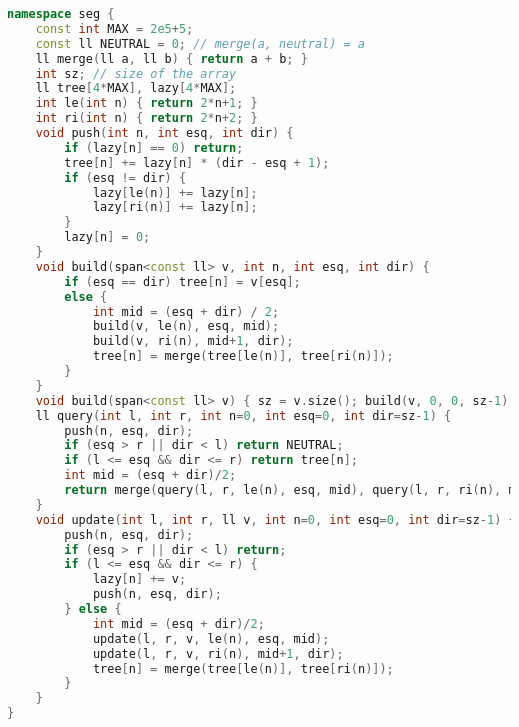 \documentclass[11pt, a4paper, twoside]{article}
\begin{document}
\begin{lstlisting}[language=C++]
namespace seg {
    const int MAX = 2e5+5;
    const ll NEUTRAL = 0; // merge(a, neutral) = a
    ll merge(ll a, ll b) { return a + b; }
    int sz; // size of the array
    ll tree[4*MAX], lazy[4*MAX];
    int le(int n) { return 2*n+1; }
    int ri(int n) { return 2*n+2; }
    void push(int n, int esq, int dir) {
        if (lazy[n] == 0) return;
        tree[n] += lazy[n] * (dir - esq + 1);
        if (esq != dir) {
            lazy[le(n)] += lazy[n];
            lazy[ri(n)] += lazy[n];
        }
        lazy[n] = 0;
    }
    void build(span<const ll> v, int n, int esq, int dir) {
        if (esq == dir) tree[n] = v[esq];
        else {
            int mid = (esq + dir) / 2;
            build(v, le(n), esq, mid);
            build(v, ri(n), mid+1, dir);
            tree[n] = merge(tree[le(n)], tree[ri(n)]);
        }
    }
    void build(span<const ll> v) { sz = v.size(); build(v, 0, 0, sz-1); }
    ll query(int l, int r, int n=0, int esq=0, int dir=sz-1) {
        push(n, esq, dir);
        if (esq > r || dir < l) return NEUTRAL;
        if (l <= esq && dir <= r) return tree[n];
        int mid = (esq + dir)/2;
        return merge(query(l, r, le(n), esq, mid), query(l, r, ri(n), mid+1, dir));
    }
    void update(int l, int r, ll v, int n=0, int esq=0, int dir=sz-1) {
        push(n, esq, dir);
        if (esq > r || dir < l) return;
        if (l <= esq && dir <= r) {
            lazy[n] += v;
            push(n, esq, dir);
        } else {
            int mid = (esq + dir)/2;
            update(l, r, v, le(n), esq, mid);
            update(l, r, v, ri(n), mid+1, dir);
            tree[n] = merge(tree[le(n)], tree[ri(n)]);
        }
    }
}
\end{lstlisting}
\end{document}
